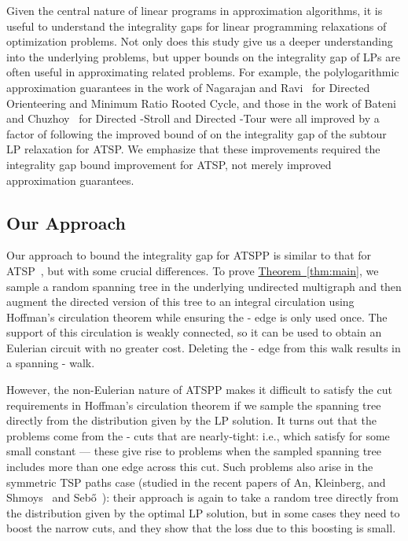 \documentclass[11pt]{article}
\newcommand{\lref}[2][]{\hyperref[#2]{#1~\ref*{#2}}}
\theoremstyle{definition}
\begin{document}
Given the central nature of linear programs in approximation algorithms,
it is useful to understand the integrality gaps for linear programming
relaxations of optimization problems. Not only does this study give us a
deeper understanding into the underlying problems, but upper bounds
on the integrality gap of LPs are often useful in approximating related problems.
For example, the polylogarithmic approximation guarantees in
the work of Nagarajan and Ravi~\cite{NR07} for Directed Orienteering and
Minimum Ratio Rooted Cycle, and those in the work of Bateni and
Chuzhoy~\cite{BC10} for Directed -Stroll and Directed -Tour were
all improved by a factor of  following the improved bound of
 on the integrality gap of the subtour LP relaxation for ATSP.
We emphasize that these improvements required the integrality gap
bound improvement for ATSP, not merely improved approximation guarantees.



\subsection{Our Approach}
\label{sec:approach}


Our approach to bound the integrality gap for ATSPP is similar to that
for ATSP~\cite{AGMSS,GS11}, but with some crucial differences.
To prove \lref[Theorem]{thm:main}, we sample a
random spanning tree in the underlying undirected multigraph
and then augment the directed version of this tree
to an integral circulation using Hoffman's circulation theorem while
ensuring the - edge is only used once. The support of this circulation
is weakly connected, so it can be used to obtain an Eulerian circuit with no greater cost.
Deleting the - edge from this walk results in a spanning - walk.

However, the non-Eulerian nature of ATSPP makes it difficult
to satisfy the cut requirements in Hoffman's circulation theorem if we
sample the spanning tree directly from the distribution given by the LP
solution. It turns out that the problems come from the - cuts 
that are nearly-tight: i.e., which satisfy  for some small constant  --- these give rise to problems
when the sampled spanning tree includes more than one edge across this
cut. Such problems also arise in the symmetric TSP paths case (studied
in the recent papers of An, Kleinberg, and Shmoys~\cite{AKS12} and Seb\H{o}~\cite{Sebo13}): their
approach is again to take a random tree directly from the distribution
given by the optimal LP solution, but in some cases they need to boost
the narrow cuts, and they show that the loss due to this boosting is
small.
\end{document}
